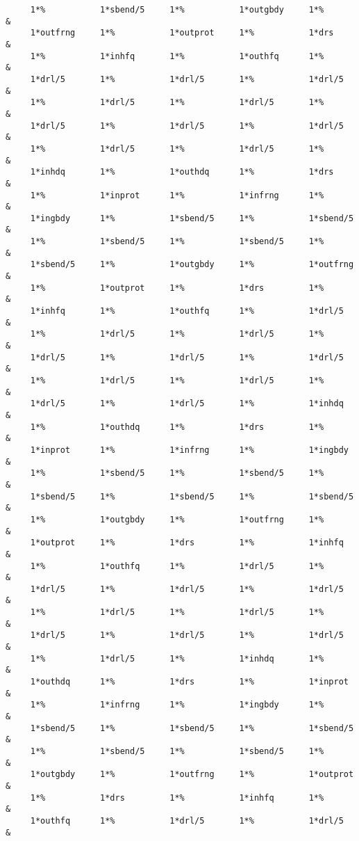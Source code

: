 \begin{footnotesize}
\begin{verbatim}
     1*%           1*sbend/5     1*%           1*outgbdy     1*%        &
     1*outfrng     1*%           1*outprot     1*%           1*drs      &
     1*%           1*inhfq       1*%           1*outhfq      1*%        &
     1*drl/5       1*%           1*drl/5       1*%           1*drl/5    &
     1*%           1*drl/5       1*%           1*drl/5       1*%        &
     1*drl/5       1*%           1*drl/5       1*%           1*drl/5    &
     1*%           1*drl/5       1*%           1*drl/5       1*%        &
     1*inhdq       1*%           1*outhdq      1*%           1*drs      &
     1*%           1*inprot      1*%           1*infrng      1*%        &
     1*ingbdy      1*%           1*sbend/5     1*%           1*sbend/5  &
     1*%           1*sbend/5     1*%           1*sbend/5     1*%        &
     1*sbend/5     1*%           1*outgbdy     1*%           1*outfrng  &
     1*%           1*outprot     1*%           1*drs         1*%        &
     1*inhfq       1*%           1*outhfq      1*%           1*drl/5    &
     1*%           1*drl/5       1*%           1*drl/5       1*%        &
     1*drl/5       1*%           1*drl/5       1*%           1*drl/5    &
     1*%           1*drl/5       1*%           1*drl/5       1*%        &
     1*drl/5       1*%           1*drl/5       1*%           1*inhdq    &
     1*%           1*outhdq      1*%           1*drs         1*%        &
     1*inprot      1*%           1*infrng      1*%           1*ingbdy   &
     1*%           1*sbend/5     1*%           1*sbend/5     1*%        &
     1*sbend/5     1*%           1*sbend/5     1*%           1*sbend/5  &
     1*%           1*outgbdy     1*%           1*outfrng     1*%        &
     1*outprot     1*%           1*drs         1*%           1*inhfq    &
     1*%           1*outhfq      1*%           1*drl/5       1*%        &
     1*drl/5       1*%           1*drl/5       1*%           1*drl/5    &
     1*%           1*drl/5       1*%           1*drl/5       1*%        &
     1*drl/5       1*%           1*drl/5       1*%           1*drl/5    &
     1*%           1*drl/5       1*%           1*inhdq       1*%        &
     1*outhdq      1*%           1*drs         1*%           1*inprot   &
     1*%           1*infrng      1*%           1*ingbdy      1*%        &
     1*sbend/5     1*%           1*sbend/5     1*%           1*sbend/5  &
     1*%           1*sbend/5     1*%           1*sbend/5     1*%        &
     1*outgbdy     1*%           1*outfrng     1*%           1*outprot  &
     1*%           1*drs         1*%           1*inhfq       1*%        &
     1*outhfq      1*%           1*drl/5       1*%           1*drl/5    &

\end{verbatim}
\end{footnotesize}
